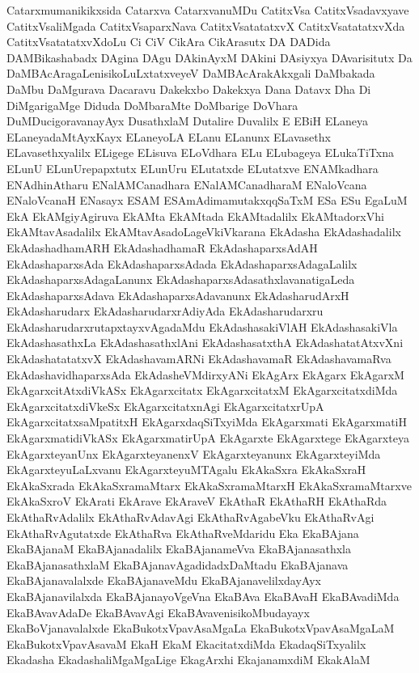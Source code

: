 {Catarxmumanikikxsida
Catarxva
CatarxvanuMDu
CatitxVsa
CatitxVsadavxyave
CatitxVsaliMgada
CatitxVsaparxNava
CatitxVsatatatxvX
CatitxVsatatatxvXda
CatitxVsatatatxvXdoLu
Ci
CiV
CikAra
CikArasutx
DA
DADida
DAMBikashabadx
DAgina
DAgu
DAkinAyxM
DAkini
DAsiyxya
DAvarisitutx
Da
DaMBAcAragaLenisikoLuLxtatxveyeV
DaMBAcArakAkxgali
DaMbakada
DaMbu
DaMgurava
Dacaravu
Dakekxbo
Dakekxya
Dana
Datavx
Dha
Di
DiMgarigaMge
Diduda
DoMbaraMte
DoMbarige
DoVhara
DuMDucigoravanayAyx
DusathxlaM
Dutalire
Duvalilx
E
EBiH
ELaneya
ELaneyadaMtAyxKayx
ELaneyoLA
ELanu
ELanunx
ELavasethx
ELavasethxyalilx
ELigege
ELisuva
ELoVdhara
ELu
ELubageya
ELukaTiTxna
ELunU
ELunUrepapxtutx
ELunUru
ELutatxde
ELutatxve
ENAMkadhara
ENAdhinAtharu
ENalAMCanadhara
ENalAMCanadharaM
ENaloVcana
ENaloVcanaH
ENasayx
ESAM
ESAmAdimamutakxqqSaTxM
ESa
ESu
EgaLuM
EkA
EkAMgiyAgiruva
EkAMta
EkAMtada
EkAMtadalilx
EkAMtadorxVhi
EkAMtavAsadalilx
EkAMtavAsadoLageVkiVkarana
EkAdasha
EkAdashadalilx
EkAdashadhamARH
EkAdashadhamaR
EkAdashaparxsAdAH
EkAdashaparxsAda
EkAdashaparxsAdada
EkAdashaparxsAdagaLalilx
EkAdashaparxsAdagaLanunx
EkAdashaparxsAdasathxlavanatigaLeda
EkAdashaparxsAdava
EkAdashaparxsAdavanunx
EkAdasharudArxH
EkAdasharudarx
EkAdasharudarxrAdiyAda
EkAdasharudarxru
EkAdasharudarxrutapxtayxvAgadaMdu
EkAdashasakiVlAH
EkAdashasakiVla
EkAdashasathxLa
EkAdashasathxlAni
EkAdashasatxthA
EkAdashatatAtxvXni
EkAdashatatatxvX
EkAdashavamARNi
EkAdashavamaR
EkAdashavamaRva
EkAdashavidhaparxsAda
EkAdasheVMdirxyANi
EkAgArx
EkAgarx
EkAgarxM
EkAgarxcitAtxdiVkASx
EkAgarxcitatx
EkAgarxcitatxM
EkAgarxcitatxdiMda
EkAgarxcitatxdiVkeSx
EkAgarxcitatxnAgi
EkAgarxcitatxrUpA
EkAgarxcitatxsaMpatitxH
EkAgarxdaqSiTxyiMda
EkAgarxmati
EkAgarxmatiH
EkAgarxmatidiVkASx
EkAgarxmatirUpA
EkAgarxte
EkAgarxtege
EkAgarxteya
EkAgarxteyanUnx
EkAgarxteyanenxV
EkAgarxteyanunx
EkAgarxteyiMda
EkAgarxteyuLaLxvanu
EkAgarxteyuMTAgalu
EkAkaSxra
EkAkaSxraH
EkAkaSxrada
EkAkaSxramaMtarx
EkAkaSxramaMtarxH
EkAkaSxramaMtarxve
EkAkaSxroV
EkArati
EkArave
EkAraveV
EkAthaR
EkAthaRH
EkAthaRda
EkAthaRvAdalilx
EkAthaRvAdavAgi
EkAthaRvAgabeVku
EkAthaRvAgi
EkAthaRvAgutatxde
EkAthaRva
EkAthaRveMdaridu
Eka
EkaBAjana
EkaBAjanaM
EkaBAjanadalilx
EkaBAjanameVva
EkaBAjanasathxla
EkaBAjanasathxlaM
EkaBAjanavAgadidadxDaMtadu
EkaBAjanava
EkaBAjanavalalxde
EkaBAjanaveMdu
EkaBAjanavelilxdayAyx
EkaBAjanavilalxda
EkaBAjanayoVgeVna
EkaBAva
EkaBAvaH
EkaBAvadiMda
EkaBAvavAdaDe
EkaBAvavAgi
EkaBAvavenisikoMbudayayx
EkaBoVjanavalalxde
EkaBukotxVpavAsaMgaLa
EkaBukotxVpavAsaMgaLaM
EkaBukotxVpavAsavaM
EkaH
EkaM
EkacitatxdiMda
EkadaqSiTxyalilx
Ekadasha
EkadashaliMgaMgaLige
EkagArxhi
EkajanamxdiM
EkakAlaM
}
